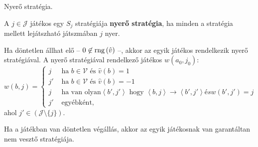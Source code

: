 \begin{definicio}
    Nyerő stratégia.

    A $j \in \mathcal{J}$ játékos egy $S_j$ stratégiája {\bf nyerő stratégia},
    ha minden a stratégia mellett lejátszható játszmában $j$ nyer.

    Ha döntetlen állhat elő -- $0 \not\in \operatorname{rng}\left( \hat{v} \right)$ --,
    akkor az egyik játékos rendelkezik nyerő stratégiával. A nyerő
    stratégiával rendelkező játékos $w(a_0, j_0)$: \[
        w(b,j) = \begin{cases}
            j & \text{ ha } b \in \mathcal{V} \text{ és } \hat{v}(b) = 1 \\
            j' & \text{ ha } b \in \mathcal{V} \text{ és } \hat{v}(b) = -1 \\
            j & \text{ ha van olyan} \left<b', j' \right> \text{ hogy }
            \left<b, j \right> \rightarrow \left<b', j' \right> és
            w(b', j') = j\\
            j' & \text{ egyébként,}
        \end{cases}
    \]
    ahol $j' \in (\mathcal{J} \setminus \{j\})$.
\end{definicio}

\begin{megjegyzes}
    Ha a játékban van döntetlen végállás, akkor az egyik játékosnak van
    garantáltan nem vesztő stratégiája.
\end{megjegyzes}

